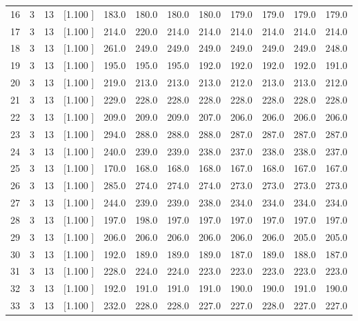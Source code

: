 \documentclass[12pt,a4paper]{article}
\begin{document}
\begin{center}
{\begin{tabular}{r r r r r r r r r r r r}
  16&  3& 13&[1.100     ]&   183.0&   180.0&   180.0&   180.0&   179.0&   179.0&   179.0&   179.0\\[-0.02in]
  17&  3& 13&[1.100     ]&   214.0&   220.0&   214.0&   214.0&   214.0&   214.0&   214.0&   214.0\\[-0.02in]
  18&  3& 13&[1.100     ]&   261.0&   249.0&   249.0&   249.0&   249.0&   249.0&   249.0&   248.0\\[-0.02in]
  19&  3& 13&[1.100     ]&   195.0&   195.0&   195.0&   192.0&   192.0&   192.0&   192.0&   191.0\\[-0.02in]
  20&  3& 13&[1.100     ]&   219.0&   213.0&   213.0&   213.0&   212.0&   213.0&   213.0&   212.0\\[-0.02in]
  21&  3& 13&[1.100     ]&   229.0&   228.0&   228.0&   228.0&   228.0&   228.0&   228.0&   228.0\\[-0.02in]
  22&  3& 13&[1.100     ]&   209.0&   209.0&   209.0&   207.0&   206.0&   206.0&   206.0&   206.0\\[-0.02in]
  23&  3& 13&[1.100     ]&   294.0&   288.0&   288.0&   288.0&   287.0&   287.0&   287.0&   287.0\\[-0.02in]
  24&  3& 13&[1.100     ]&   240.0&   239.0&   239.0&   238.0&   237.0&   238.0&   238.0&   237.0\\[-0.02in]
  25&  3& 13&[1.100     ]&   170.0&   168.0&   168.0&   168.0&   167.0&   168.0&   167.0&   167.0\\[-0.02in]
  26&  3& 13&[1.100     ]&   285.0&   274.0&   274.0&   274.0&   273.0&   273.0&   273.0&   273.0\\[-0.02in]
  27&  3& 13&[1.100     ]&   244.0&   239.0&   239.0&   238.0&   234.0&   234.0&   234.0&   234.0\\[-0.02in]
  28&  3& 13&[1.100     ]&   197.0&   198.0&   197.0&   197.0&   197.0&   197.0&   197.0&   197.0\\[-0.02in]
  29&  3& 13&[1.100     ]&   206.0&   206.0&   206.0&   206.0&   206.0&   206.0&   205.0&   205.0\\[-0.02in]
  30&  3& 13&[1.100     ]&   192.0&   189.0&   189.0&   189.0&   187.0&   189.0&   188.0&   187.0\\[-0.02in]
  31&  3& 13&[1.100     ]&   228.0&   224.0&   224.0&   223.0&   223.0&   223.0&   223.0&   223.0\\[-0.02in]
  32&  3& 13&[1.100     ]&   192.0&   191.0&   191.0&   191.0&   190.0&   190.0&   191.0&   190.0\\[-0.02in]
  33&  3& 13&[1.100     ]&   232.0&   228.0&   228.0&   227.0&   227.0&   228.0&   227.0&   227.0\\[-0.02in]

\end{tabular}}
\end{center}
\end{document}
